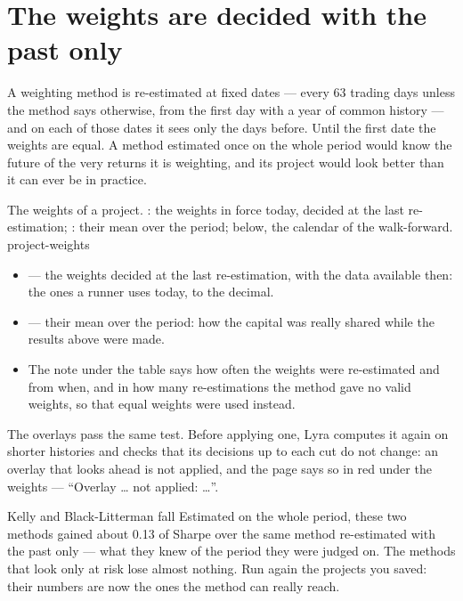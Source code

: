 \section{The weights are decided with the past only}\label{sez:project-weights}

A weighting method is re-estimated at fixed dates --- every 63 trading days
unless the method says otherwise, from the first day with a year of common
history --- and on each of those dates it sees only the days before. Until
the first date the weights are equal. A method estimated once on the whole
period would know the future of the very returns it is weighting, and its
project would look better than it can ever be in practice.

  {The weights of a project. : the weights in force today, decided
   at the last re-estimation; : their mean over the period;
   below, the calendar of the walk-forward.}
  {project-weights}

\begin{itemize}
  \item {} --- the weights decided at the last re-estimation, with
    the data available then: the ones a runner uses today, to the decimal.
  \item {} --- their mean over the period: how the capital was
    really shared while the results above were made.
  \item The note under the table says how often the weights were
    re-estimated and from when, and in how many re-estimations the method
    gave no valid weights, so that equal weights were used instead.
\end{itemize}

\noindent
The overlays pass the same test. Before applying one, Lyra computes it again
on shorter histories and checks that its decisions up to each cut do not
change: an overlay that looks ahead is not applied, and the page says so in
red under the weights --- \enquote{Overlay \ldots{} not applied: \ldots}.

\begin{nota}{Kelly and Black-Litterman fall}
Estimated on the whole period, these two methods gained about 0.13 of Sharpe
over the same method re-estimated with the past only --- what they knew of the
period they were judged on. The methods that look only at risk lose almost
nothing. Run again the projects you saved: their numbers are now the ones
the method can really reach.
\end{nota}

